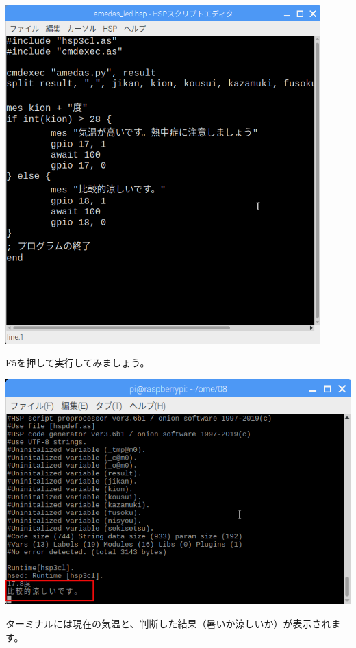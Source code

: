 \begin{center}
\includegraphics[width=12.173cm]{./text08-img/textbook-img038.png}

\end{center}

\bigskip


\bigskip

\clearpage
F5を押して実行してみましょう。



\begin{center}
\includegraphics[width=\textwidth]{./text08-img/textbook-img039.png}

\end{center}
ターミナルには現在の気温と、判断した結果（暑いか涼しいか）が表示されます。

